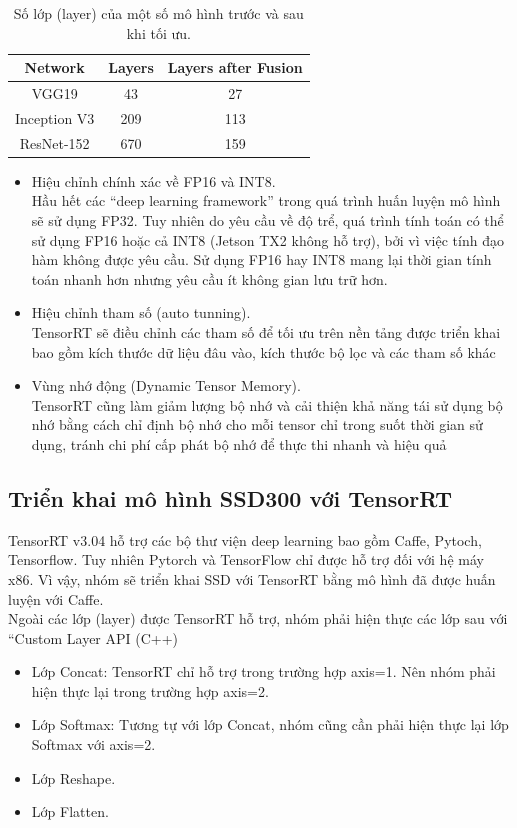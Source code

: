 \documentclass[a4paper]{report}
\begin{document}
\begin{table}[h!]
	\centering
	\caption{Số lớp (layer) của một số mô hình trước và sau khi tối ưu.}
	\begin{tabular}{|ccc|}
		\hline
		Network & Layers & Layers after Fusion \\ \hline
		VGG19 & 43 & 27\\ 
		Inception V3  & 209 & 113 \\
		ResNet-152 & 670 & 159 \\ \hline
	\end{tabular}
\end{table}

\begin{itemize}
	\item Hiệu chỉnh chính xác về  FP16 và INT8.\\
	Hầu hết các “deep learning framework” trong quá trình huấn luyện mô hình sẽ sử dụng FP32. Tuy nhiên do yêu cầu về độ trể, quá trình tính toán có thể sử dụng FP16 hoặc cả INT8 (Jetson TX2 không hỗ trợ), bởi vì việc tính đạo hàm không được yêu cầu. Sử dụng FP16 hay INT8 mang lại thời gian tính toán nhanh hơn nhưng yêu cầu ít không gian lưu trữ hơn.
	\item Hiệu chỉnh tham số (auto tunning).\\
	TensorRT sẽ điều chỉnh các tham số để tối ưu trên nền tảng được triển khai bao gồm kích thước dữ liệu đâu vào, kích thước bộ lọc và các tham số khác
	\item Vùng nhớ động (Dynamic Tensor Memory).\\
	TensorRT cũng làm giảm lượng bộ nhớ và cải thiện khả năng tái sử dụng bộ nhớ bằng cách chỉ định bộ nhớ cho mỗi tensor chỉ trong suốt thời gian sử dụng, tránh chi phí cấp phát bộ nhớ để thực thi nhanh và hiệu quả
\end{itemize}

\subsection{Triển khai mô hình SSD300 với TensorRT}
TensorRT v3.04 hỗ trợ các bộ thư viện deep learning bao gồm Caffe, Pytoch, Tensorflow. Tuy nhiên Pytorch và TensorFlow chỉ được hỗ trợ đối với hệ máy x86. Vì vậy, nhóm sẽ triển khai SSD với TensorRT bằng mô hình đã được huấn luyện với Caffe. \\

Ngoài các lớp (layer) được TensorRT hỗ trợ, nhóm phải hiện thực các lớp sau với “Custom Layer API (C++)
\begin{itemize}
	\item Lớp Concat: TensorRT chỉ hỗ trợ trong trường hợp axis=1. Nên nhóm phải hiện thực lại trong trường hợp axis=2.
	\item Lớp Softmax: Tương tự với lớp Concat, nhóm cũng cần phải hiện thực lại lớp Softmax với axis=2.
	\item Lớp Reshape.
	\item Lớp Flatten.
\end{itemize}
\end{document}

